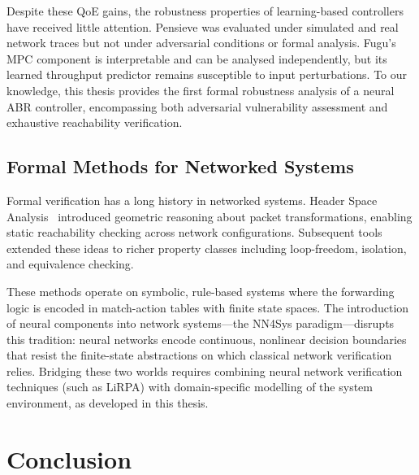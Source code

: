 \documentclass[thesis]{uofithesis} %
\begin{document}
    Despite these QoE gains, the robustness properties of learning-based
    controllers have received little attention.  Pensieve was evaluated
    under simulated and real network traces but not under adversarial
    conditions or formal analysis.  Fugu's MPC component is
    interpretable and can be analysed independently, but its learned
    throughput predictor remains susceptible to input perturbations.
    To our knowledge, this thesis provides the first formal robustness
    analysis of a neural ABR controller, encompassing both adversarial
    vulnerability assessment and exhaustive reachability verification.


    \subsection{Formal Methods for Networked Systems}
    \label{sec:related-formal-net}

    Formal verification has a long history in networked systems.
    Header Space Analysis~\cite{hsa} introduced geometric reasoning
    about packet transformations, enabling static reachability checking
    across network configurations.  Subsequent tools extended these
    ideas to richer property classes including loop-freedom, isolation,
    and equivalence checking.

    These methods operate on symbolic, rule-based systems where the
    forwarding logic is encoded in match-action tables with finite
    state spaces.  The introduction of neural components into network
    systems---the NN4Sys paradigm---disrupts this tradition: neural
    networks encode continuous, nonlinear decision boundaries that
    resist the finite-state abstractions on which classical network
    verification relies.  Bridging these two worlds requires combining
    neural network verification techniques (such as LiRPA) with
    domain-specific modelling of the system environment, as developed
    in this thesis.



\section{Conclusion}
\label{chap:conclusion}
\end{document}
